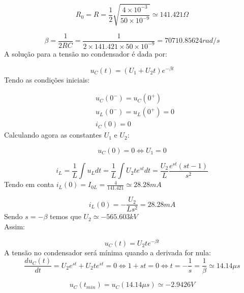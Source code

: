 \begin{equation}
  R_0 = R = \frac{1}{2} \sqrt{\frac{4\times10^{-3}}{50\times10^{-9}}} \simeq 141.421 \Omega
\end{equation}

\begin{equation}
  \beta = \frac{1}{2RC} = \frac{1}{2 \times 141.421 \times 50 \times 10^{-9}} = 70710.85624 rad/s
\end{equation}
A solução para a tensão no condensador é dada por:

\begin{equation}
  u_C(t) = (U_1+U_2 t) e^{-\beta t}
\end{equation}
Tendo as condições iniciais:

\begin{equation}
  \begin{aligned}
    &u_C(0^-) = u_C(0^+)\\
    &u_L(0^-) = u_L(0^+) = 0\\
    &i_C(0) = 0
  \end{aligned}
\end{equation}
Calculando agora as constantes $U_1$ e $U_2$:

\begin{equation}
  u_C(0) = 0 \Leftrightarrow U_1 = 0
\end{equation}

\begin{equation}
  i_L = \frac{1}{L} \int u_L dt = \frac{1}{L} \int U_2 t e^{st} dt = \frac{U_2}{L} \frac{e^{st}(st-1)}{s^2}
\end{equation}
Tendo em conta $i_L(0) = I_{0L} = \frac{4}{141.421} \simeq 28.28 mA$

\begin{equation}
  i_L(0) =-\frac{U_2}{Ls^2} = 28.28 mA 
\end{equation}
Sendo $s = -\beta$ temos que $U_2 \simeq -565.603 kV$
\\Assim:

\begin{equation}
  u_C(t) = U_2 t e^{-\beta t}
\end{equation}
A tensão no condensador será mínima quando a derivada for nula:
\begin{equation}
  \frac{du_C(t)}{dt} = U_2 e^{st} + U_2 t e^{st} = 0 \Leftrightarrow 1 + st = 0 \Leftrightarrow t = -\frac{1}{s} = \frac{1}{\beta} \simeq 14.14 \mu s
\end{equation}

\begin{equation}
  u_C(t_{min}) = u_C(14.14 \mu s) \simeq -2.9426 V
\end{equation}

